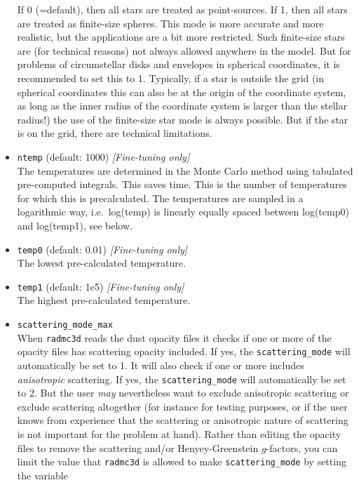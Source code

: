 \documentclass{report}
\begin{document}
\begin{itemize}
  If 0 (=default), then all stars are treated as point-sources. If 1, then 
  all stars are treated as finite-size spheres. This mode is more accurate 
  and more realistic, but the applications are a bit more restricted.
  Such finite-size stars are (for technical reasons) not always allowed 
  anywhere in the model. But for problems of circumstellar disks and envelopes
  in spherical coordinates, it is recommended to set this to 1. Typically,
  if a star is outside the grid (in spherical coordinates this can also be
  at the origin of the coordinate system, as long as the inner radius of
  the coordinate system is larger than the stellar radius!) the use of the
  finite-size star mode is always possible. But if the star is on the grid,
  there are technical limitations.
\item {\small\tt ntemp} (default: 1000) {\em [Fine-tuning only]}\\
  The temperatures are determined in the Monte Carlo method using tabulated
  pre-computed integrals. This saves time. This is the number of
  temperatures for which this is precalculated. The temperatures are sampled
  in a logarithmic way, i.e.\ log(temp) is linearly equally spaced between
  log(temp0) and log(temp1), see below.
\item {\small\tt temp0} (default: 0.01) {\em [Fine-tuning only]}\\
  The lowest pre-calculated temperature.
\item {\small\tt temp1} (default: 1e5) {\em [Fine-tuning only]}\\
  The highest pre-calculated temperature.
\item {\small\tt scattering\_mode\_max}\\
  When {\small\tt radmc3d} reads the dust opacity files it checks if one or
  more of the opacity files has scattering opacity included. If yes, the
  {\small\tt scattering\_mode} will automatically be set to 1. It will also
  check if one or more includes {\em anisotropic} scattering. If yes, the
  {\small\tt scattering\_mode} will automatically be set to 2. But the user
  {\em may} nevertheless want to exclude anisotropic scattering or exclude
  scattering altogether (for instance for testing purposes, or if the user
  knows from experience that the scattering or anisotropic nature of
  scattering is not important for the problem at hand). Rather than editing
  the opacity files to remove the scattering and/or Henyey-Greenstein
  $g$-factors, you can limit the value that {\small\tt radmc3d} is allowed
  to make {\small\tt scattering\_mode} by setting the variable {\small\tt
}
\end{itemize}
\end{document}
